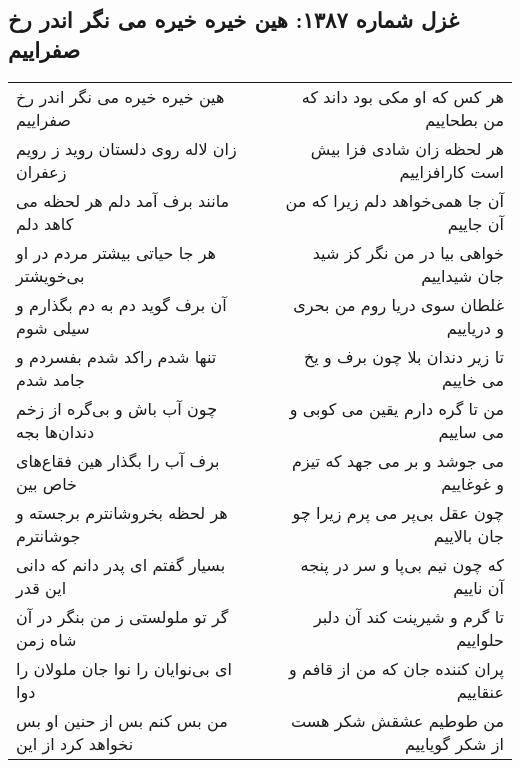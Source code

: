 \begin{center}
\section*{غزل شماره ۱۳۸۷: هین خیره خیره می نگر اندر رخ صفراییم}
\label{sec:1387}
\begin{longtable}{l p{0.5cm} r}
هین خیره خیره می نگر اندر رخ صفراییم
&&
هر کس که او مکی بود داند که من بطحاییم
\\
زان لاله روی دلستان روید ز رویم زعفران
&&
هر لحظه زان شادی فزا بیش است کارافزاییم
\\
مانند برف آمد دلم هر لحظه می کاهد دلم
&&
آن جا همی‌خواهد دلم زیرا که من آن جاییم
\\
هر جا حیاتی بیشتر مردم در او بی‌خویشتر
&&
خواهی بیا در من نگر کز شید جان شیداییم
\\
آن برف گوید دم به دم بگذارم و سیلی شوم
&&
غلطان سوی دریا روم من بحری و دریاییم
\\
تنها شدم راکد شدم بفسردم و جامد شدم
&&
تا زیر دندان بلا چون برف و یخ می خاییم
\\
چون آب باش و بی‌گره از زخم دندان‌ها بجه
&&
من تا گره دارم یقین می کوبی و می ساییم
\\
برف آب را بگذار هین فقاع‌های خاص بین
&&
می جوشد و بر می جهد که تیزم و غوغاییم
\\
هر لحظه بخروشانترم برجسته و جوشانترم
&&
چون عقل بی‌پر می پرم زیرا چو جان بالاییم
\\
بسیار گفتم ای پدر دانم که دانی این قدر
&&
که چون نیم بی‌پا و سر در پنجه آن ناییم
\\
گر تو ملولستی ز من بنگر در آن شاه زمن
&&
تا گرم و شیرینت کند آن دلبر حلواییم
\\
ای بی‌نوایان را نوا جان ملولان را دوا
&&
پران کننده جان که من از قافم و عنقاییم
\\
من بس کنم بس از حنین او بس نخواهد کرد از این
&&
من طوطیم عشقش شکر هست از شکر گویاییم
\\
\end{longtable}
\end{center}
